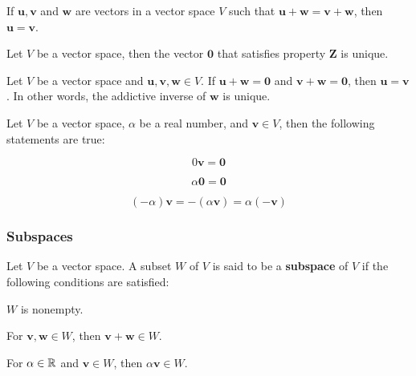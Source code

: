 \documentclass[a4paper,12pt]{article}
\begin{document}
\begin{thm}
  If $\mathbf{u},\mathbf{v}$ and $\mathbf{w}$ are vectors in a vector space $V$ such that $\mathbf{u}+\mathbf{w}=\mathbf{v}+\mathbf{w}$, then $\mathbf{u}=\mathbf{v}$.
\end{thm}\n

\begin{thm}
  Let $V$ be a vector space, then the vector $\mathbf{0}$ that satisfies property \textbf{Z} is unique.
\end{thm}\n

\begin{thm}
  Let $V$ be a vector space and $\mathbf{u},\mathbf{v},\mathbf{w}\in V$. If $\mathbf{u}+\mathbf{w}=\mathbf{0}$ and $\mathbf{v}+\mathbf{w}=\mathbf{0}$, then $\mathbf{u}=\mathbf{v}$. In other words, the addictive inverse of $\mathbf{w}$ is unique.
\end{thm}\n

\begin{thm}
  Let $V$ be a vector space, $\alpha$ be a real number, and $\mathbf{v}\in V$, then the following statements are true:

  \begin{alist}
    \item

    $$0\mathbf{v}=\mathbf{0}$$

    \item

    $$\alpha\mathbf{0}=\mathbf{0}$$

    \item

    $$(-\alpha)\mathbf{v}=-(\alpha\mathbf{v})=\alpha(-\mathbf{v})$$
  \end{alist}
\end{thm}

\propdisp

\subsubsection{Subspaces}
\begin{dft}
  Let $V$ be a vector space. A subset $W$ of $V$ is said to be a \textbf{subspace} of $V$ if the following conditions are satisfied:

  \begin{alist}
    \item $W$ is nonempty.
    \item For $\mathbf{v},\mathbf{w}\in W$, then $\mathbf{v}+\mathbf{w}\in W$.
    \item For $\alpha\in\mathbb{R}$ and $\mathbf{v}\in W$, then $\alpha\mathbf{v}\in W$.
  \end{alist}
\end{dft}\n
\end{document}
